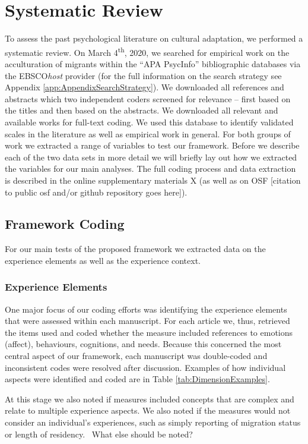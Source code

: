 \documentclass[man, 12pt, a4paper]{apa7}
\newcommand\Question[1][2ex]{%
  \renewcommand\stacktype{L}%
  \scaleto{\stackon[1.3pt]{\color{red}$\triangle$}{\tiny\bfseries ?}}{#1}}%
\begin{document}
\section{Systematic Review}
To assess the past psychological literature on cultural adaptation, we performed a systematic review. On March 4\textsuperscript{th}, 2020, we searched for empirical work on the acculturation of migrants within the ``APA PsycInfo'' bibliographic databases via the EBSCO\textit{host} provider (for the full information on the search strategy see Appendix \ref{app:AppendixSearchStrategy}). We downloaded all references and abstracts which two independent coders screened for relevance -- first based on the titles and then based on the abstracts. We downloaded all relevant and available works for full-text coding. We used this database to identify validated scales in the literature as well as empirical work in general. For both groups of work we extracted a range of variables to test our framework. Before we describe each of the two data sets in more detail we will briefly lay out how we extracted the variables for our main analyses. The full coding process and data extraction is described in the online supplementary materials X (as well as on OSF [citation to public osf and/or github repository goes here]).

\subsection{Framework Coding}
For our main tests of the proposed framework we extracted data on the experience elements as well as the experience context.
\subsubsection{Experience Elements}
One major focus of our coding efforts was identifying the experience elements that were assessed within each manuscript. For each article we, thus, retrieved the items used and coded whether the measure included references to emotions (affect), behaviours, cognitions, and needs. Because this concerned the most central aspect of our framework, each manuscript was double-coded and inconsistent codes were resolved after discussion. Examples of how individual aspects were identified and coded are in Table \ref{tab:DimensionExamples}.


At this stage we also noted if measures included concepts that are complex and relate to multiple experience aspects. We also noted if the measures would not consider an individual’s experiences, such as simply reporting of migration status or length of residency. \Question\ What else should be noted?
\end{document}
